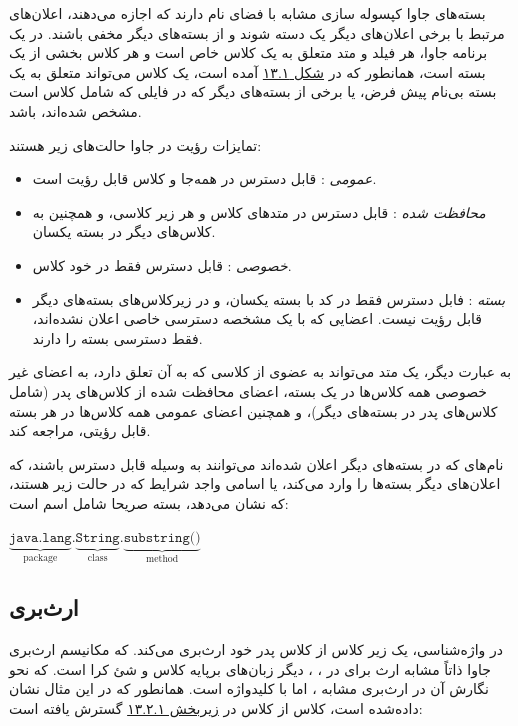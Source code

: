\documentclass[a4paper,12pt]{report}
\newcommand{\lrInlineMono}[1]{{\color{steelBlue}\lr{\texttt{#1}}}}
\begin{document}
	بسته‌های جاوا کپسوله سازی مشابه با فضای نام 
	دارند که اجازه می‌دهند، اعلان‌های مرتبط با برخی اعلان‌های دیگر یک دسته شوند و از بسته‌های دیگر مخفی باشند. 
در یک برنامه جاوا، هر فیلد و متد متعلق به یک کلاس خاص است و هر کلاس بخشی از یک بسته است، همانطور که در 
	\hyperref[fig1:subsec2:sec2:chap13]{
	شکل ۱۳.۱}
	\linebreak
 آمده است، یک کلاس می‌تواند متعلق به یک بسته بی‌نام پیش فرض،‌ یا برخی از بسته‌های دیگر که در فایلی که شامل کلاس است مشخص شده‌اند، باشد.

	تمایزات رؤیت
	 در جاوا حالت‌های زیر هستند:
\begin{itemize}[nosep]
	\renewcommand{\labelitemi}{\color{gray}\scriptsize$\blacksquare$}
	\item
	\textit{
	عمومی
}: قابل دسترس در همه‌جا و کلاس قابل رؤیت است.
	\item\textit{
	محافظت شده
}: قابل دسترس در متد‌های کلاس و هر زیر کلاسی، و همچنین به کلاس‌های دیگر در بسته یکسان. 
	\item\textit{
	خصوصی
}: قابل دسترس فقط در خود کلاس.
	\item\textit{
		بسته
}: فابل دسترس فقط در کد با بسته یکسان، و در زیرکلاس‌های بسته‌های دیگر قابل رؤیت نیست. اعضایی که با یک مشخصه دسترسی خاصی اعلان نشده‌اند، فقط دسترسی بسته را دارند.
\end{itemize}

	به عبارت دیگر، یک متد می‌تواند به عضوی از کلاسی که به آن تعلق دارد، به اعضای غیر خصوصی همه کلاس‌ها در یک بسته، اعضای محافظت شده از کلاس‌های پدر (شامل کلاس‌های پدر در بسته‌های دیگر)، و همچنین اعضای عمومی همه کلاس‌ها در هر بسته قابل رؤیتی، مراجعه کند.
	
	نام‌های که در بسته‌های دیگر اعلان شده‌اند می‌توانند به وسیله 
	\lrInlineMono{import}
	قابل دسترس باشند، که اعلان‌های دیگر بسته‌ها را وارد می‌کند، یا اسامی واجد شرایط که در حالت زیر هستند، که  نشان می‌دهد، بسته صریحا شامل اسم است:  

\begin{latin}
	\color{steelBlue}
	$\underbrace{\texttt{java.lang}}_{\text{package}}.
	\underbrace{\texttt{String}}_{\text{class}}.
	\underbrace{\texttt{substring()}}_{\text{method}}$
\end{latin}

\subsection{
	ارث‌بری}
\label{subsec3:sec2:chap13}
	در واژه‌شناسی، یک زیر کلاس از کلاس پدر خود ارث‌بری می‌کند. که مکانیسم ارث‌بری جاوا ذاتاً مشابه ارث برای در 
	، 
	، دیگر زبان‌های برپایه کلاس و شئ کرا است. که نحو نگارش آن در ارث‌بری مشابه 
	، اما با کلیدواژه 
	\lrInlineMono{extends}
	است. همانطور که در این مثال نشان داده‌شده است، کلاس 
	\lrInlineMono{ColorPoint}
	از کلاس 
	\lrInlineMono{Point}
	در 
	\hyperref[subsec1:sec2:chap13]{
	زیربخش ۱۳.۲.۱} گسترش یافته است:
\end{document}
